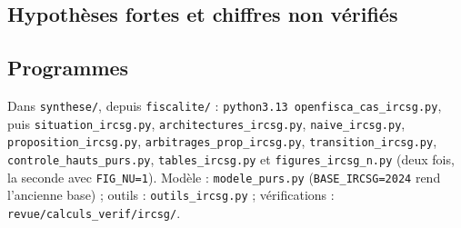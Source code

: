 \subsection{Hypothèses fortes et chiffres non vérifiés}



\subsection{Programmes}

{\sloppy Dans \texttt{synthese/}, depuis \texttt{fiscalite/} : \texttt{python3.13 openfisca\_cas\_ircsg.py}, puis
\texttt{situation\_ircsg.py}, \texttt{architectures\_ircsg.py}, \texttt{naive\_ircsg.py},
\texttt{proposition\_ircsg.py}, \texttt{arbitrages\_prop\_ircsg.py}, \texttt{transition\_ircsg.py},
\texttt{controle\_hauts\_purs.py}, \texttt{tables\_ircsg.py} et \texttt{figures\_ircsg\_n.py} (deux fois, la seconde
avec \texttt{FIG\_NU=1}). Modèle : \texttt{modele\_purs.py} (\texttt{BASE\_IRCSG=2024} rend l'ancienne base) ;
outils : \texttt{outils\_ircsg.py} ; vérifications : \texttt{revue/calculs\_verif/ircsg/}.\par}
